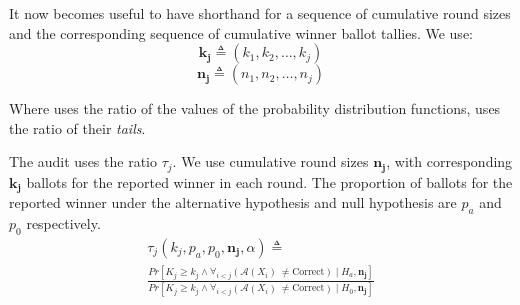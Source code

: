 It now becomes useful to have shorthand for a sequence of cumulative round sizes and the corresponding sequence
of cumulative winner ballot tallies.
We use:
$$\bm{k_j}\triangleq(k_1,k_2,\ldots,k_j)$$
$$\bm{n_j}\triangleq(n_1,n_2,\ldots,n_j)$$

Where \BRAVO uses the ratio of the values of the probability distribution functions, \Minerva uses the ratio of their \emph{tails}.

\begin{definition} \label{def:minerva_ratio} The \R \Minerva audit uses the ratio $\tau_j$. We use cumulative round sizes $\bm{n_j}$, with corresponding $\bm{k_j}$ ballots for the reported winner in each round. The proportion of ballots for the reported winner under the alternative hypothesis and null hypothesis are $p_a$ and $p_0$ respectively.
         \begin{equation}
         \begin{aligned}
             \label{eqn:tau}
                 \tau_{j}(k_{j}, p_a,p_0, \bm{n_j}, \alpha )  \triangleq\\
                 \frac{Pr[K_{j} \geq k_{j} \wedge \forall_{i < j} ({\mathcal{A}}(X_i) ~\neq \text{Correct}) \mid H_a, \bm{n_j}]}{Pr[K_{j} \geq k_{j} \wedge \forall_{i < j} ({\mathcal{A}}(X_i) ~\neq \text{Correct}) \mid H_0, \bm{n_j}]}
         \end{aligned}
         \end{equation}
\end{definition}



\begin{comment}
\begin{definition}[$ (\alpha, p, \bm{n_j} ) $-\Minerva]
     \label{def:minerva}
     Given \B $(\alpha, p)$-\BRAVO and cumulative round sizes\\ $\bm{n_j}$, the corresponding \R \Minerva stopping rule for the $j^{th}$ round is:
 \begin{equation}
     \mathcal{A}(X_{j})=  \left\{ \begin{array}{ll} \text{Correct} ~~~~ \tau_{j}(k_{j}, p_a, \frac{1}{2}, \bm{n_j}, \alpha ) \geq \frac{1}{\alpha}\\
             Undetermined ~~else \\
         \end{array}
         \right .
         \label{eqn:minerva-test}
 \end{equation}
\end{definition}
\end{comment}
